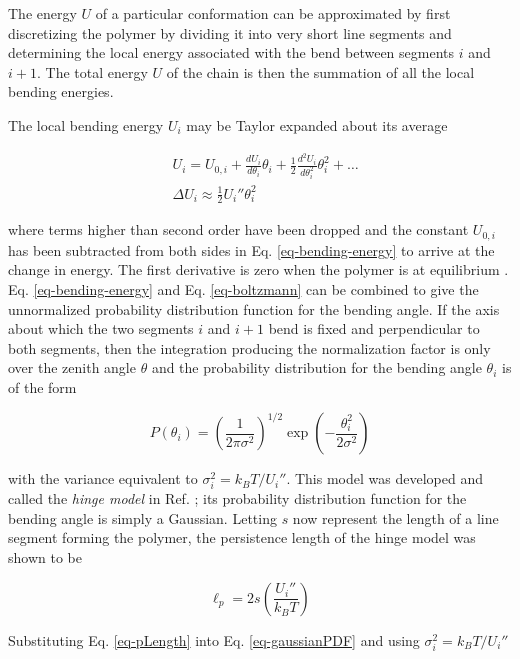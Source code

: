 \documentclass[12pt, a4paper]{article}
\begin{document}
The energy $U$ of a particular conformation can be approximated by
first discretizing the polymer by dividing it into very short line
segments and determining the local energy associated with the bend
between segments $i$ and $i+1$. The total energy $U$ of the chain
is then the summation of all the local bending energies.

The local bending energy $U_i$ may be Taylor expanded about its
average

\begin{align}
  &U_i = U_{0,i} + \frac{dU_i}{d\theta_i} \theta_{i} + \frac{1}{2} \frac{d^2 U_i}{d \theta_i^2}\theta_i^2 + \ldots \\
  &\Delta U_i \approx \frac{1}{2} U_i'' \theta_i^2 \label{eq-bending-energy}
\end{align}

where terms higher than second order have been dropped and the
constant $U_{0,i}$ has been subtracted from both sides in
Eq. \eqref{eq-bending-energy} to arrive at the change in
energy. The first derivative is zero when the polymer is at
equilibrium
\cite{schellman-biopolymers-1974}. Eq. \eqref{eq-bending-energy}
and Eq. \eqref{eq-boltzmann} can be combined to give the
unnormalized probability distribution function for the bending
angle. If the axis about which the two segments $i$ and $i+1$ bend
is fixed and perpendicular to both segments, then the integration
producing the normalization factor is only over the zenith angle
$\theta$ and the probability distribution for the bending angle
$\theta_i$ is of the form

\begin{equation}
  P\left( \theta_i \right) = \left( \frac{1}{2 \pi \sigma^2} \right)^{1/2} \exp \left( -\frac{\theta_i^2}{2 \sigma^2} \right) \label{eq-gaussianPDF}
\end{equation}

with the variance equivalent to $\sigma_i^2 = k_{B} T/U_i''$. This
model was developed and called the \textit{hinge model} in
Ref. \cite{schellman-biopolymers-1974}; its probability
distribution function for the bending angle is simply a
Gaussian. Letting $s$ now represent the length of a line segment
forming the polymer, the persistence length of the hinge model was
shown to be

\begin{equation}
  \label{eq-pLength}
  \ell_p = 2 s \left( \frac{U_i''}{k_{B} T} \right)
\end{equation}

Substituting Eq. \eqref{eq-pLength} into Eq.
\eqref{eq-gaussianPDF} and using $\sigma_i^2 = k_{B}T/U_i''$
\end{document}
